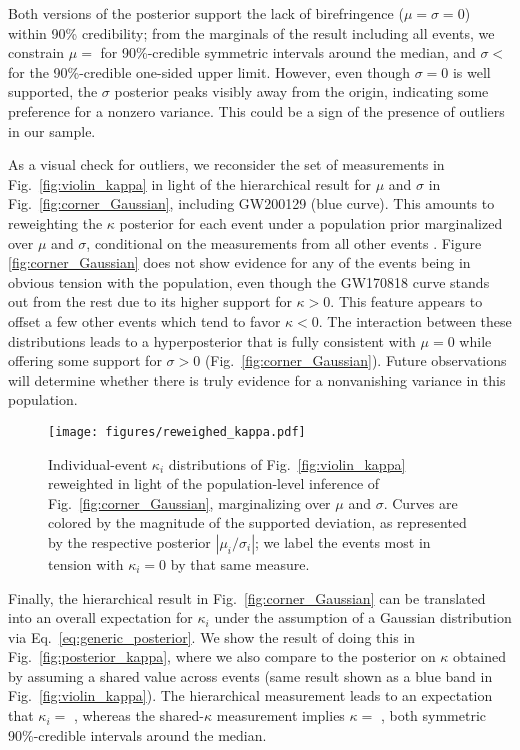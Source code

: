 \documentclass[aps,prd,twocolumn,superscriptaddress,preprintnumbers,floatfix,nofootinbib]{revtex4-2}
\begin{document}
Both versions of the posterior support the lack of birefringence ($\mu = \sigma = 0$) within 90\% credibility; from the marginals of the result including all events, we constrain $\mu =$ for 90\%-credible symmetric intervals around the median, and $\sigma <$ for the 90\%-credible one-sided upper limit.
However, even though $\sigma = 0$ is well supported, the $\sigma$ posterior peaks visibly away from the origin, indicating some preference for a nonzero variance.
This could be a sign of the presence of outliers in our sample.

As a visual check for outliers, we reconsider the set of measurements in Fig.~\ref{fig:violin_kappa} in light of the hierarchical result for $\mu$ and $\sigma$ in Fig.~\ref{fig:corner_Gaussian}, including GW200129 (blue curve).
This amounts to reweighting the $\kappa$ posterior for each event under a population prior marginalized over $\mu$ and $\sigma$, conditional on the measurements from all other events \cite{Callister:T2100301}.
Figure \ref{fig:corner_Gaussian} does not show evidence for any of the events being in obvious tension with the population, even though the GW170818 curve stands out from the rest due to its higher support for $\kappa > 0$.
This feature appears to offset a few other events which tend to favor $\kappa < 0$.
The interaction between these distributions leads to a hyperposterior that is fully consistent with $\mu = 0$ while offering some support for $\sigma > 0$ (Fig.~\ref{fig:corner_Gaussian}).
Future observations will determine whether there is truly evidence for a nonvanishing variance in this population.

\begin{figure}
    \texttt{[image: figures/reweighed\_kappa.pdf]}
    \caption{
        Individual-event $\kappa_i$ distributions of Fig.~\ref{fig:violin_kappa} reweighted in light of the population-level inference of Fig.~\ref{fig:corner_Gaussian}, marginalizing over $\mu$ and $\sigma$.
        Curves are colored by the magnitude of the supported deviation, as represented by the respective posterior $|\mu_i / \sigma_i|$; we label the events most in tension with $\kappa_i = 0$ by that same measure.
    }
    \label{fig:reweighted_kappa}
\end{figure}

Finally, the hierarchical result in Fig.~\ref{fig:corner_Gaussian} can be translated into an overall expectation for $\kappa_i$ under the assumption of a Gaussian distribution via Eq.~\eqref{eq:generic_posterior}.
We show the result of doing this in Fig.~\ref{fig:posterior_kappa}, where we also compare to the posterior on $\kappa$ obtained by assuming a shared value across events (same result shown as a blue band in Fig.~\ref{fig:violin_kappa}).
The hierarchical measurement leads to an expectation that $\kappa_i =$ , whereas the shared-$\kappa$ measurement implies $\kappa =$ , both symmetric 90\%-credible intervals around the median.  
\end{document}
